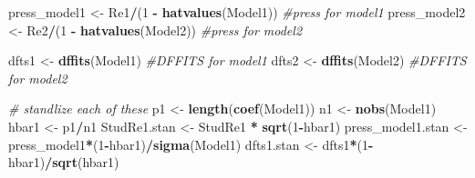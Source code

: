 \documentclass[]{article}
\newenvironment{Shaded}{\begin{snugshade}}{\end{snugshade}}
\newcommand{\KeywordTok}[1]{\textcolor[rgb]{0.13,0.29,0.53}{\textbf{#1}}}
\newcommand{\DecValTok}[1]{\textcolor[rgb]{0.00,0.00,0.81}{#1}}
\newcommand{\StringTok}[1]{\textcolor[rgb]{0.31,0.60,0.02}{#1}}
\newcommand{\CommentTok}[1]{\textcolor[rgb]{0.56,0.35,0.01}{\textit{#1}}}
\newcommand{\OperatorTok}[1]{\textcolor[rgb]{0.81,0.36,0.00}{\textbf{#1}}}
\newcommand{\NormalTok}[1]{#1}
\begin{document}
\begin{Shaded}
\begin{Highlighting}[]
\NormalTok{press_model1 <-}\StringTok{ }\NormalTok{Re1}\OperatorTok{/}\NormalTok{(}\DecValTok{1} \OperatorTok{-}\StringTok{ }\KeywordTok{hatvalues}\NormalTok{(Model1)) }\CommentTok{#press for model1}
\NormalTok{press_model2 <-}\StringTok{ }\NormalTok{Re2}\OperatorTok{/}\NormalTok{(}\DecValTok{1} \OperatorTok{-}\StringTok{ }\KeywordTok{hatvalues}\NormalTok{(Model2)) }\CommentTok{#press for model2}

\NormalTok{dfts1 <-}\StringTok{ }\KeywordTok{dffits}\NormalTok{(Model1) }\CommentTok{#DFFITS for model1}
\NormalTok{dfts2 <-}\StringTok{ }\KeywordTok{dffits}\NormalTok{(Model2) }\CommentTok{#DFFITS for model2}

\CommentTok{# standlize each of these}
\NormalTok{p1 <-}\StringTok{ }\KeywordTok{length}\NormalTok{(}\KeywordTok{coef}\NormalTok{(Model1))}
\NormalTok{n1 <-}\StringTok{ }\KeywordTok{nobs}\NormalTok{(Model1)}
\NormalTok{hbar1 <-}\StringTok{ }\NormalTok{p1}\OperatorTok{/}\NormalTok{n1}
\NormalTok{StudRe1.stan <-}\StringTok{ }\NormalTok{StudRe1 }\OperatorTok{*}\StringTok{ }\KeywordTok{sqrt}\NormalTok{(}\DecValTok{1}\OperatorTok{-}\NormalTok{hbar1)}
\NormalTok{press_model1.stan <-}\StringTok{ }\NormalTok{press_model1}\OperatorTok{*}\NormalTok{(}\DecValTok{1}\OperatorTok{-}\NormalTok{hbar1)}\OperatorTok{/}\KeywordTok{sigma}\NormalTok{(Model1)}
\NormalTok{dfts1.stan <-}\StringTok{ }\NormalTok{dfts1}\OperatorTok{*}\NormalTok{(}\DecValTok{1}\OperatorTok{-}\NormalTok{hbar1)}\OperatorTok{/}\KeywordTok{sqrt}\NormalTok{(hbar1)}



\end{Highlighting}
\end{Shaded}
\end{document}
